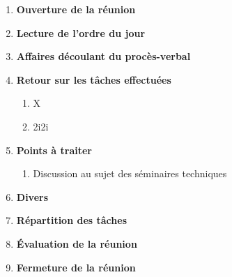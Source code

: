 \documentclass[12pt]{ULojpv}
\begin{document}
\entete
\begin{enumerate}
   \item \textbf{Ouverture de la réunion}
   \item \textbf{Lecture de l'ordre du jour}
   \item \textbf{Affaires découlant du procès-verbal}
   \item \textbf{Retour sur les tâches effectuées}
      \begin{enumerate}
         \item X
         \item 2i2i
      \end{enumerate}
   \item \textbf{Points à traiter}
      \begin{enumerate}
         \item Discussion au sujet des séminaires techniques
            
      \end{enumerate}
   \item \textbf{Divers}
   \item \textbf{Répartition des tâches}
   \item \textbf{Évaluation de la réunion}

   \item \textbf{Fermeture de la réunion}
\end{enumerate}
\end{document}
